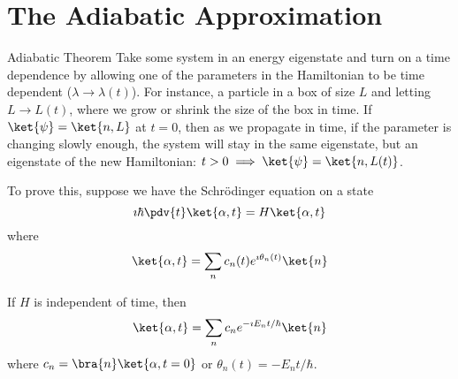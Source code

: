 \documentclass[a4paper,twoside,master.tex]{subfiles}
\begin{document}

\section{The Adiabatic Approximation}
\label{sec:the_adiabatic_approximation}

\begin{theorem}{Adiabatic Theorem}
    Take some system in an energy eigenstate and turn on a time dependence by allowing one of the parameters in the Hamiltonian to be time dependent ($ \lambda \to \lambda(t) $). For instance, a particle in a box of size $ L $ and letting $ L \to L(t) $, where we grow or shrink the size of the box in time. If $\ket{\psi} =\ket{n,L} $ at $ t = 0 $, then as we propagate in time, if the parameter is changing slowly enough, the system will stay in the same eigenstate, but an eigenstate of the new Hamiltonian: $ t > 0 \implies\ket{\psi} =\ket{n, L(t)} $.
\end{theorem}

To prove this, suppose we have the Schr\"odinger equation on a state
\begin{equation}
    \imath \hbar \pdv{t}\ket{\alpha, t} = H\ket{\alpha, t}
\end{equation}
where
\begin{equation}
    \ket{\alpha, t} = \sum_n c_n(t) e^{\imath \theta_n(t)}\ket{n}
\end{equation}


If $ H $ is independent of time, then
\begin{equation}
    \ket{\alpha, t} = \sum_n c_n e^{- \imath E_n t / \hbar}\ket{n}
\end{equation}
where $ c_n =\bra{n}\ket{\alpha, t = 0} $ or $ \theta_n(t) = - E_n t / \hbar $.
\end{document}
